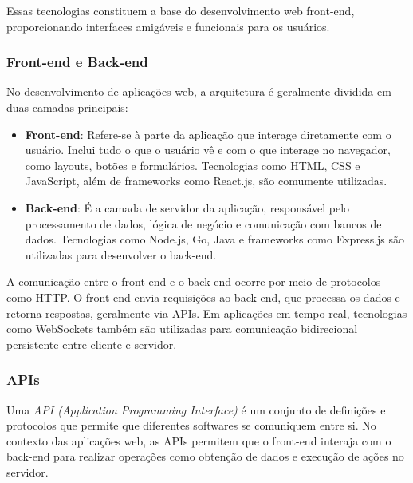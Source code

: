 Essas tecnologias constituem a base do desenvolvimento web front-end, proporcionando interfaces amigáveis e funcionais para os usuários.

\subsubsection{Front-end e Back-end}


No desenvolvimento de aplicações web, a arquitetura é geralmente dividida em duas camadas principais:

\begin{itemize}
    \item \textbf{Front-end}: Refere-se à parte da aplicação que interage diretamente com o usuário. Inclui tudo o que o usuário vê e com o que interage no navegador, como layouts, botões e formulários. Tecnologias como HTML, CSS e JavaScript, além de frameworks como React.js, são comumente utilizadas.
    \item \textbf{Back-end}: É a camada de servidor da aplicação, responsável pelo processamento de dados, lógica de negócio e comunicação com bancos de dados. Tecnologias como Node.js, Go, Java e frameworks como Express.js são utilizadas para desenvolver o back-end.
\end{itemize}

A comunicação entre o front-end e o back-end ocorre por meio de protocolos como HTTP. O front-end envia requisições ao back-end, que processa os dados e retorna respostas, geralmente via APIs. Em aplicações em tempo real, tecnologias como WebSockets também são utilizadas para comunicação bidirecional persistente entre cliente e servidor.

\subsubsection{APIs}


Uma \emph{API (Application Programming Interface)} é um conjunto de definições e protocolos que permite que diferentes softwares se comuniquem entre si. No contexto das aplicações web, as APIs permitem que o front-end interaja com o back-end para realizar operações como obtenção de dados e execução de ações no servidor.

